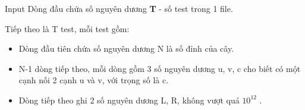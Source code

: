Input  
Dòng đầu chứa số nguyên dương   \textbf{    T   }   - số test trong 1 file.  

   Tiếp theo là T test, mỗi test gồm:  
\begin{itemize}
	\item     Dòng đầu tiên chứa số nguyên dương N là số đỉnh của cây.   
	\item     N-1 dòng tiếp theo, mỗi dòng gồm 3 số nguyên dương u, v, c cho biết có một cạnh nối 2 cạnh u và v, với trọng số là c.   
	\item     Dòng tiếp theo ghi 2 số nguyên dương L, R, không vượt quá $10^{12}$    .   
\end{itemize}